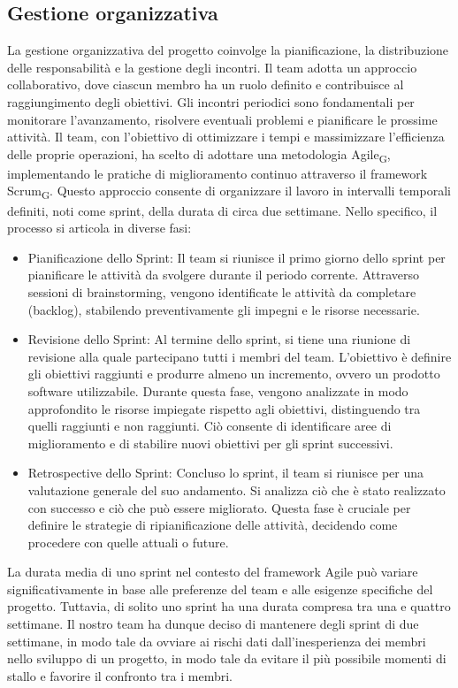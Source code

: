 \documentclass{article}
\begin{document}
\subsection{Gestione organizzativa}
La gestione organizzativa del progetto coinvolge la pianificazione, la distribuzione delle responsabilità e la gestione degli incontri. Il team adotta un approccio collaborativo, dove ciascun membro ha un ruolo definito e contribuisce al raggiungimento degli obiettivi. Gli incontri periodici sono fondamentali per monitorare l'avanzamento, risolvere eventuali problemi e pianificare le prossime attività. Il team, con l'obiettivo di ottimizzare i tempi e massimizzare l'efficienza delle proprie operazioni, ha scelto di adottare una metodologia Agile\textsubscript{G}, implementando le pratiche di miglioramento continuo attraverso il framework Scrum\textsubscript{G}. Questo approccio consente di organizzare il lavoro in intervalli temporali definiti, noti come sprint, della durata di circa due settimane. Nello specifico, il processo si articola in diverse fasi:
\begin{itemize}
    \item Pianificazione dello Sprint: Il team si riunisce il primo giorno dello sprint per pianificare le attività da svolgere durante il periodo corrente. Attraverso sessioni di brainstorming, vengono identificate le attività da completare (backlog), stabilendo preventivamente gli impegni e le risorse necessarie.
    \item Revisione dello Sprint: Al termine dello sprint, si tiene una riunione di revisione alla quale partecipano tutti i membri del team. L'obiettivo è definire gli obiettivi raggiunti e produrre almeno un incremento, ovvero un prodotto software utilizzabile. Durante questa fase, vengono analizzate in modo approfondito le risorse impiegate rispetto agli obiettivi, distinguendo tra quelli raggiunti e non raggiunti. Ciò consente di identificare aree di miglioramento e di stabilire nuovi obiettivi per gli sprint successivi.
    \item Retrospective dello Sprint: Concluso lo sprint, il team si riunisce per una valutazione generale del suo andamento. Si analizza ciò che è stato realizzato con successo e ciò che può essere migliorato. Questa fase è cruciale per definire le strategie di ripianificazione delle attività, decidendo come procedere con quelle attuali o future.
\end{itemize}
La durata media di uno sprint nel contesto del framework Agile può variare significativamente in base alle preferenze del team e alle esigenze specifiche del progetto. Tuttavia, di solito uno sprint ha una durata compresa tra una e quattro settimane. Il nostro team ha dunque deciso di mantenere degli sprint di due settimane, in modo tale da ovviare ai rischi dati dall'inesperienza dei membri nello sviluppo di un progetto, in modo tale da evitare il più possibile momenti di stallo e favorire il confronto tra i membri.
\end{document}
